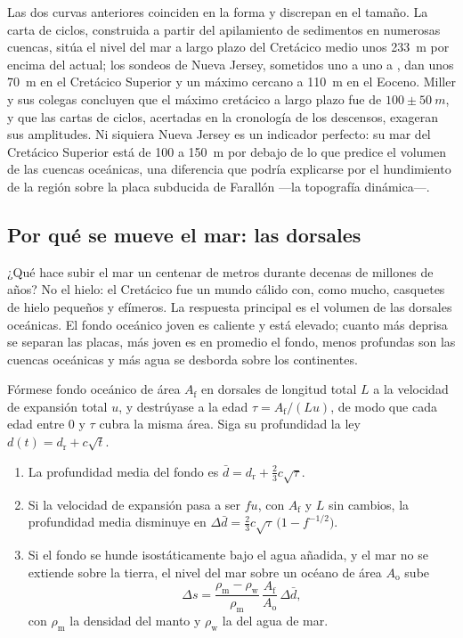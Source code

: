 Las dos curvas anteriores coinciden en la forma y discrepan en el tamaño. La carta de ciclos, construida a partir del
apilamiento de sedimentos en numerosas cuencas, sitúa el nivel del mar a largo plazo del Cretácico medio
unos \qty{233}{m} por encima del actual; los sondeos de Nueva Jersey, sometidos uno a uno a , dan unos
\qty{70}{m} en el Cretácico Superior y un máximo cercano a \qty{110}{m} en el Eoceno. Miller y sus
colegas concluyen que el máximo cretácico a largo plazo fue de $100 \pm \qty{50}{m}$, y que las
cartas de ciclos, acertadas en la cronología de los descensos, exageran sus amplitudes. Ni siquiera Nueva Jersey
es un indicador perfecto: su mar del Cretácico Superior está de 100 a \qty{150}{m} por debajo de lo que predice el volumen de
las cuencas oceánicas, una diferencia que podría explicarse por el hundimiento de la región sobre la placa subducida de
Farallón ---la topografía dinámica---.

\subsection*{Por qué se mueve el mar: las dorsales}

¿Qué hace subir el mar un centenar de metros durante decenas de millones de años? No el hielo: el Cretácico
fue un mundo cálido con, como mucho, casquetes de hielo pequeños y efímeros. La respuesta principal es el volumen de
las dorsales oceánicas. El fondo oceánico joven es caliente y está elevado; cuanto más deprisa se separan las placas, más
joven es en promedio el fondo, menos profundas son las cuencas oceánicas y más agua se desborda sobre
los continentes.

\begin{proposition}\label{prop:b2:phanerozoic-earth:ridge}
Fórmese fondo oceánico de área $A_{\text{f}}$ en dorsales de longitud total $L$ a la velocidad de expansión
total $u$, y destrúyase a la edad $\tau = A_{\text{f}}/(Lu)$, de modo que cada edad entre 0
y $\tau$ cubra la misma área. Siga su profundidad la ley $d(t) = d_{\text{r}} + c\sqrt t$.
\begin{enumerate}
  \item La profundidad media del fondo es $\bar d = d_{\text{r}} + \tfrac23 c\sqrt\tau$.
  \item Si la velocidad de expansión pasa a ser $fu$, con $A_{\text{f}}$ y $L$ sin cambios, la profundidad
        media disminuye en $\Delta\bar d = \tfrac23 c\sqrt\tau\,\bigl(1 - f^{-1/2}\bigr)$.
  \item Si el fondo se hunde isostáticamente bajo el agua añadida, y el mar no se extiende
        sobre la tierra, el nivel del mar sobre un océano de área $A_{\text{o}}$ sube
        \[
        \Delta s = \frac{\rho_{\text{m}} - \rho_{\text{w}}}{\rho_{\text{m}}}\,
        \frac{A_{\text{f}}}{A_{\text{o}}}\,\Delta\bar d ,
        \]
        con $\rho_{\text{m}}$ la densidad del manto y $\rho_{\text{w}}$ la del agua de mar.
\end{enumerate}
\end{proposition}

